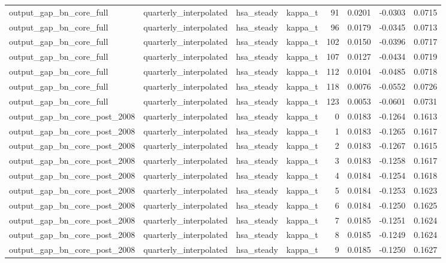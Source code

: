 \begin{tabular}{llllrrrr}
output\_gap\_bn\_core\_full & quarterly\_interpolated & hsa\_steady & kappa\_t & 91 & 0.0201 & -0.0303 & 0.0715 \\
output\_gap\_bn\_core\_full & quarterly\_interpolated & hsa\_steady & kappa\_t & 96 & 0.0179 & -0.0345 & 0.0713 \\
output\_gap\_bn\_core\_full & quarterly\_interpolated & hsa\_steady & kappa\_t & 102 & 0.0150 & -0.0396 & 0.0717 \\
output\_gap\_bn\_core\_full & quarterly\_interpolated & hsa\_steady & kappa\_t & 107 & 0.0127 & -0.0434 & 0.0719 \\
output\_gap\_bn\_core\_full & quarterly\_interpolated & hsa\_steady & kappa\_t & 112 & 0.0104 & -0.0485 & 0.0718 \\
output\_gap\_bn\_core\_full & quarterly\_interpolated & hsa\_steady & kappa\_t & 118 & 0.0076 & -0.0552 & 0.0726 \\
output\_gap\_bn\_core\_full & quarterly\_interpolated & hsa\_steady & kappa\_t & 123 & 0.0053 & -0.0601 & 0.0731 \\
output\_gap\_bn\_core\_post\_2008 & quarterly\_interpolated & hsa\_steady & kappa\_t & 0 & 0.0183 & -0.1264 & 0.1613 \\
output\_gap\_bn\_core\_post\_2008 & quarterly\_interpolated & hsa\_steady & kappa\_t & 1 & 0.0183 & -0.1265 & 0.1617 \\
output\_gap\_bn\_core\_post\_2008 & quarterly\_interpolated & hsa\_steady & kappa\_t & 2 & 0.0183 & -0.1267 & 0.1615 \\
output\_gap\_bn\_core\_post\_2008 & quarterly\_interpolated & hsa\_steady & kappa\_t & 3 & 0.0183 & -0.1258 & 0.1617 \\
output\_gap\_bn\_core\_post\_2008 & quarterly\_interpolated & hsa\_steady & kappa\_t & 4 & 0.0184 & -0.1254 & 0.1618 \\
output\_gap\_bn\_core\_post\_2008 & quarterly\_interpolated & hsa\_steady & kappa\_t & 5 & 0.0184 & -0.1253 & 0.1623 \\
output\_gap\_bn\_core\_post\_2008 & quarterly\_interpolated & hsa\_steady & kappa\_t & 6 & 0.0184 & -0.1250 & 0.1625 \\
output\_gap\_bn\_core\_post\_2008 & quarterly\_interpolated & hsa\_steady & kappa\_t & 7 & 0.0185 & -0.1251 & 0.1624 \\
output\_gap\_bn\_core\_post\_2008 & quarterly\_interpolated & hsa\_steady & kappa\_t & 8 & 0.0185 & -0.1249 & 0.1624 \\
output\_gap\_bn\_core\_post\_2008 & quarterly\_interpolated & hsa\_steady & kappa\_t & 9 & 0.0185 & -0.1250 & 0.1627 \\

\end{tabular}
